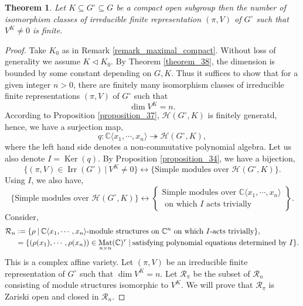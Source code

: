 \documentclass[8pt]{article}
\newtheorem{theorem}{Theorem} [section]
\DeclareMathOperator{\Ker}{Ker}
\DeclareMathOperator{\Mat}{Mat}
\DeclareMathOperator{\Irr}{Irr}
\newcommand{\defeq}{\vcentcolon=}
\newcommand{\C}[0]{\mathbb{C}}
\newcommand{\sep}[0]{\:|\:}
\newcommand{\hecke}[0]{\mathscr{H}}
\begin{document}
\begin{theorem}
  \label{theorem_32}
  Let $K\subseteq G^\circ\subseteq G$ be a compact open subgroup then the number of isomorphism classes of irreducible finite representation $(\pi,V)$ of $G^\circ$ such that $V^K\not=0$ is finite.
\end{theorem}
\begin{proof}
  Take $K_0$ as in Remark \ref{remark_maximal_compact}. Without loss of generality we assume $K\triangleleft K_0$. By Theorem \ref{theorem_38}, the dimension is bounded by some constant depending on $G,K$. Thus it suffices to show that for a given integer $n>0$, there are finitely many isomorphism classes of irreducible finite representations $(\pi,V)$ of $G^\circ$ such that 
  \begin{equation*}
    \dim V^K=n.
  \end{equation*}
  According to Proposition \ref{proposition_37}, $\hecke(G^\circ,K)$ is finitely generatd, hence, we have a surjection map,
  \begin{equation*}
    q:\C\langle x_1,\cdots,x_n\rangle\twoheadrightarrow\hecke(G^\circ,K),
  \end{equation*}
  where the left hand side denotes a non-commutative polynomial algebra. Let us also denote $I = \Ker(q)$. By Proposition \ref{proposition_34}, we have a bijection,
  \begin{equation*}
    \{(\pi,V)\in\Irr(G^\circ)\sep V^K\not=0\}\leftrightarrow\{\text{Simple modules over }\hecke(G^\circ,K)\}.
  \end{equation*}
  Using $I$, we also have,
  \begin{equation*}
    \{\text{Simple modules over }\hecke(G^\circ,K)\}\leftrightarrow\left\{\substack{\text{Simple modules over }\C\langle x_1,\cdots,x_n\rangle\\\text{ on which $I$ acts trivially}}\right\}.
  \end{equation*}
  Consider,
  \begin{align*}
    \mathcal{R}_n &\defeq \{ \rho\sep \text{$\C\langle x_1,\cdots,x_n\rangle$-module structures on $\C^n$ on which $I$-acts trivially}\},\\
    & = \{(\rho(x_1),\cdots,\rho(x_n))\in\Mat_{n\times n}(\C)^r \sep \text{satisfying polynomial equations determined by $I$}\}.
  \end{align*}
  This is a complex affine variety. Let $(\pi,V)$ be an irreducible finite representation of $G^\circ$ such that $\dim V^K=n$. Let $\mathcal{R}_\pi$ be the subset of $\mathcal{R}_n$ consisting of module structures 
  isomorphic to $V^K$. We will prove that $\mathcal{R}_\pi$ is Zariski open and closed in $\mathcal{R}_n$.
\end{proof}
\end{document}

